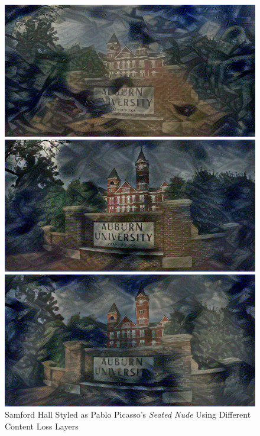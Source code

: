 \documentclass{article}
\begin{document}
\begin{figure}[htp]
\centering
\caption{Samford Hall Styled as Pablo Picasso's \textit{Seated Nude} Using
Different Content Loss Layers}
\label{fig:content-layers-effect}

    \begin{minipage}{0.3\linewidth}
    \includegraphics[width=\textwidth]{img/content-layer-selection/block1_conv1}
    \end{minipage}
    \begin{minipage}{0.3\linewidth}
    \includegraphics[width=\textwidth]{img/content-layer-selection/block2_conv1}
    \end{minipage}
    \begin{minipage}{0.3\linewidth}
    \includegraphics[width=\textwidth]{img/content-layer-selection/block3_conv1}
    \end{minipage}


\end{figure}
\end{document}
